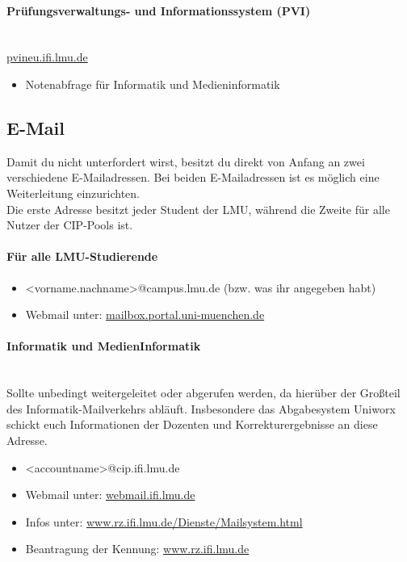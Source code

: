 \documentclass[twoside,12pt,parskip=half-]{scrartcl}
\begin{document}
\paragraph{Prüfungsverwaltungs- und Informationssystem (PVI)}\hfill\\
\url{pvineu.ifi.lmu.de}
\begin{itemize}
	\item Notenabfrage für Informatik und Medieninformatik
\end{itemize}

\clearpage

\subsection{E-Mail}
Damit du nicht unterfordert wirst, besitzt du direkt von Anfang an zwei verschiedene E-Mailadressen. Bei beiden E-Mailadressen ist es möglich eine Weiterleitung einzurichten.\\

Die erste Adresse besitzt jeder Student der LMU, während die Zweite für alle Nutzer der CIP-Pools ist.

\paragraph{Für alle LMU-Studierende}
\begin{itemize}
	\item <vorname.nachname>@campus.lmu.de (bzw. was ihr angegeben habt)
	\item Webmail unter: \url{mailbox.portal.uni-muenchen.de}
\end{itemize}

\paragraph{Informatik und MedienInformatik}\hfill\\
Sollte unbedingt weitergeleitet oder abgerufen werden, da hierüber der Großteil des Informatik-Mailverkehrs abläuft. Insbesondere das Abgabesystem Uniworx schickt euch Informationen der Dozenten und Korrekturergebnisse an diese Adresse.
\begin{itemize}
	\item <accountname>@cip.ifi.lmu.de
	\item Webmail unter: \url{webmail.ifi.lmu.de}
	\item Infos unter: \url{www.rz.ifi.lmu.de/Dienste/Mailsystem.html}
	\item Beantragung der Kennung: \url{www.rz.ifi.lmu.de}
\end{itemize}
\end{document}

